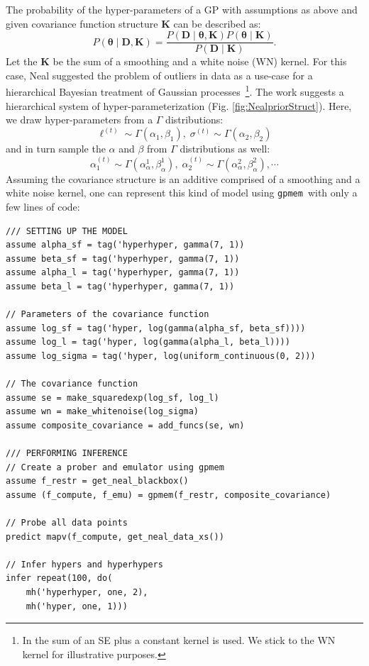 \documentclass{article} %
\newcommand{\gpmem}{\texttt{gpmem}}
\begin{document}
The probability of the hyper-parameters of a GP with assumptions as above and given covariance function structure $\mathbf{K}$ can be described as:
\begin{equation}
\label{eq:hyperProbability}
P(\bm{\theta} \mid \mathbf{D,K}) = \frac{P(\mathbf{D} \mid \bm{\theta}, \mathbf{K})P(\bm{\theta} \mid  \mathbf{K})}{P(\mathbf{D} \mid \mathbf{K})}.
\end{equation}
Let the $\mathbf{K}$ be the sum of a smoothing and a white noise (WN) kernel. For this case, Neal suggested the problem of outliers in data as a use-case for a hierarchical Bayesian treatment of Gaussian processes~\citeyearpar{neal1997monte}\footnote{In \citep{neal1997monte} the sum of an SE plus a constant kernel is used. We stick to the WN kernel for illustrative purposes.}. The work suggests a hierarchical system of hyper-parameterization (Fig. \ref{fig:NealpriorStruct}). Here, we draw hyper-parameters from a $\Gamma$ distributions:
\begin{equation}
\ell^{(t)} \sim \Gamma(\alpha_1,\beta_1),\;\sigma^{(t)} \sim \Gamma(\alpha_2,\beta_2)
\end{equation} 
and in turn sample the $\alpha$ and $\beta$ from $\Gamma$ distributions as well:
\begin{equation}
\alpha_1^{(t)} \sim \Gamma(\alpha^1_{\alpha},\beta^1_{ \alpha } ),\; \alpha_2^{(t)} \sim \Gamma(\alpha^2_{\alpha},\beta^2_{\alpha}),\cdots
\end{equation}
Assuming the covariance structure is an additive comprised of a smoothing and a white noise kernel, one can represent this kind of model using \gpmem\ with only a few lines of code:
\begin{minipage}{\linewidth}
\belowcaptionskip=-10pt
\begin{lstlisting}[frame=single,mathescape,label=alg:gphierarch,basicstyle=\selectfont\ttfamily]
/// SETTING UP THE MODEL
assume alpha_sf = tag('hyperhyper, gamma(7, 1))
assume beta_sf = tag('hyperhyper, gamma(7, 1))
assume alpha_l = tag('hyperhyper, gamma(7, 1))
assume beta_l = tag('hyperhyper, gamma(7, 1))

// Parameters of the covariance function
assume log_sf = tag('hyper, log(gamma(alpha_sf, beta_sf))))
assume log_l = tag('hyper, log(gamma(alpha_l, beta_l))))
assume log_sigma = tag('hyper, log(uniform_continuous(0, 2))) 

// The covariance function
assume se = make_squaredexp(log_sf, log_l)
assume wn = make_whitenoise(log_sigma)
assume composite_covariance = add_funcs(se, wn)

/// PERFORMING INFERENCE
// Create a prober and emulator using gpmem
assume f_restr = get_neal_blackbox()
assume (f_compute, f_emu) = gpmem(f_restr, composite_covariance)

// Probe all data points
predict mapv(f_compute, get_neal_data_xs())

// Infer hypers and hyperhypers
infer repeat(100, do(
    mh('hyperhyper, one, 2),
    mh('hyper, one, 1)))

\end{lstlisting}
\end{minipage}
\end{document}
